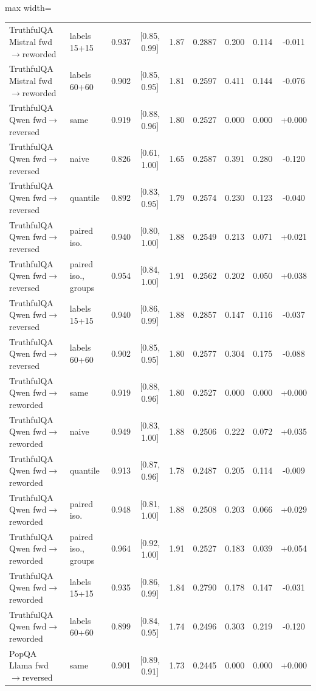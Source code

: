 \documentclass[twoside]{article}
\theoremstyle{definition}
\theoremstyle{remark}
\newcommand{\1}{\mathbf{1}}
\begin{document}
\begin{table}[t]
\begin{adjustbox}{max width=\textwidth}
\begin{tabular}{llccccccc}
TruthfulQA Mistral fwd$\to$reworded & labels 15+15 & 0.937 & [0.85, 0.99] & 1.87 & 0.2887 & 0.200 & 0.114 & -0.011\\
TruthfulQA Mistral fwd$\to$reworded & labels 60+60 & 0.902 & [0.85, 0.95] & 1.81 & 0.2597 & 0.411 & 0.144 & -0.076\\
\midrule
TruthfulQA Qwen fwd$\to$reversed & same & 0.919 & [0.88, 0.96] & 1.80 & 0.2527 & 0.000 & 0.000 & +0.000\\
TruthfulQA Qwen fwd$\to$reversed & naive & 0.826 & [0.61, 1.00] & 1.65 & 0.2587 & 0.391 & 0.280 & -0.120\\
TruthfulQA Qwen fwd$\to$reversed & quantile & 0.892 & [0.83, 0.95] & 1.79 & 0.2574 & 0.230 & 0.123 & -0.040\\
TruthfulQA Qwen fwd$\to$reversed & paired iso. & 0.940 & [0.80, 1.00] & 1.88 & 0.2549 & 0.213 & 0.071 & +0.021\\
TruthfulQA Qwen fwd$\to$reversed & paired iso., groups & 0.954 & [0.84, 1.00] & 1.91 & 0.2562 & 0.202 & 0.050 & +0.038\\
TruthfulQA Qwen fwd$\to$reversed & labels 15+15 & 0.940 & [0.86, 0.99] & 1.88 & 0.2857 & 0.147 & 0.116 & -0.037\\
TruthfulQA Qwen fwd$\to$reversed & labels 60+60 & 0.902 & [0.85, 0.95] & 1.80 & 0.2577 & 0.304 & 0.175 & -0.088\\
\midrule
TruthfulQA Qwen fwd$\to$reworded & same & 0.919 & [0.88, 0.96] & 1.80 & 0.2527 & 0.000 & 0.000 & +0.000\\
TruthfulQA Qwen fwd$\to$reworded & naive & 0.949 & [0.83, 1.00] & 1.88 & 0.2506 & 0.222 & 0.072 & +0.035\\
TruthfulQA Qwen fwd$\to$reworded & quantile & 0.913 & [0.87, 0.96] & 1.78 & 0.2487 & 0.205 & 0.114 & -0.009\\
TruthfulQA Qwen fwd$\to$reworded & paired iso. & 0.948 & [0.81, 1.00] & 1.88 & 0.2508 & 0.203 & 0.066 & +0.029\\
TruthfulQA Qwen fwd$\to$reworded & paired iso., groups & 0.964 & [0.92, 1.00] & 1.91 & 0.2527 & 0.183 & 0.039 & +0.054\\
TruthfulQA Qwen fwd$\to$reworded & labels 15+15 & 0.935 & [0.86, 0.99] & 1.84 & 0.2790 & 0.178 & 0.147 & -0.031\\
TruthfulQA Qwen fwd$\to$reworded & labels 60+60 & 0.899 & [0.84, 0.95] & 1.74 & 0.2496 & 0.303 & 0.219 & -0.120\\
\midrule
PopQA Llama fwd$\to$reversed & same & 0.901 & [0.89, 0.91] & 1.73 & 0.2445 & 0.000 & 0.000 & +0.000\\

\end{tabular}
\end{adjustbox}
\end{table}
\end{document}
